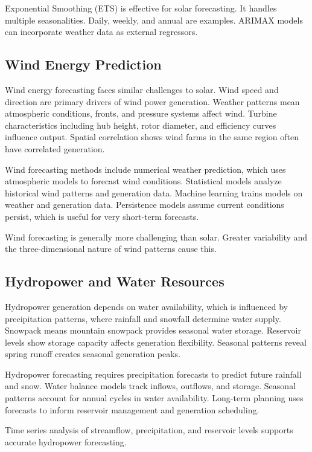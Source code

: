 Exponential Smoothing (ETS) is effective for solar forecasting. It handles multiple seasonalities. Daily, weekly, and annual are examples. ARIMAX models can incorporate weather data as external regressors.

\subsection{Wind Energy Prediction}

Wind energy forecasting faces similar challenges to solar. Wind speed and direction are primary drivers of wind power generation. Weather patterns mean atmospheric conditions, fronts, and pressure systems affect wind. Turbine characteristics including hub height, rotor diameter, and efficiency curves influence output. Spatial correlation shows wind farms in the same region often have correlated generation.

Wind forecasting methods include numerical weather prediction, which uses atmospheric models to forecast wind conditions. Statistical models analyze historical wind patterns and generation data. Machine learning trains models on weather and generation data. Persistence models assume current conditions persist, which is useful for very short-term forecasts.

Wind forecasting is generally more challenging than solar. Greater variability and the three-dimensional nature of wind patterns cause this.

\subsection{Hydropower and Water Resources}

Hydropower generation depends on water availability, which is influenced by precipitation patterns, where rainfall and snowfall determine water supply. Snowpack means mountain snowpack provides seasonal water storage. Reservoir levels show storage capacity affects generation flexibility. Seasonal patterns reveal spring runoff creates seasonal generation peaks.

Hydropower forecasting requires precipitation forecasts to predict future rainfall and snow. Water balance models track inflows, outflows, and storage. Seasonal patterns account for annual cycles in water availability. Long-term planning uses forecasts to inform reservoir management and generation scheduling.

Time series analysis of streamflow, precipitation, and reservoir levels supports accurate hydropower forecasting.

